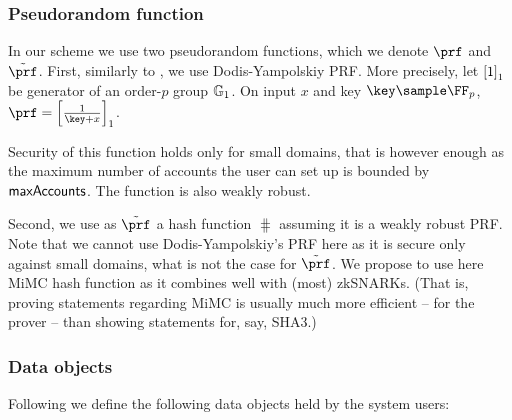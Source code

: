 \documentclass[runningheads,10pt]{llncs}
\numberwithin{equation}{section}
\begin{document}
\subsubsection{Pseudorandom function}
In our scheme we use two pseudorandom functions, which we denote $\prf$ and
$\tprf$.  First, similarly to \cite{EPRINT:DGKOS20}, we use Dodis-Yampolskiy
\cite{PKC:DodYam05} PRF. More precisely, let $\left[1 \right]_{1}$ be generator of an
order-$p$ group $\mathbb{G}_1$. On input $x$ and key $\key \sample \FF_p$, $\prf =
\gone{\frac{1}{\key + x}}$.

Security of this function holds only for small domains, that is however enough
as the maximum number of accounts the user can set up is bounded by $\mathsf{maxAccounts}$.
The function is also weakly robust.

Second, we use as $\tprf$ a hash function $\hash$ assuming it is a weakly
robust PRF. Note that we cannot use Dodis-Yampolskiy's PRF here as it is secure
only against small domains, what is not the case for $\tprf$. We propose to use
here MiMC \cite{AC:AGRRT16} hash function as it combines well with (most)
zkSNARKs. (That is, proving statements regarding MiMC is usually much more
efficient -- for the prover -- than showing statements for, say, SHA3.)

\subsubsection{Data objects}
Following \cite{EPRINT:DGKOS20} we define the following data objects held by
the system users:
\end{document}

